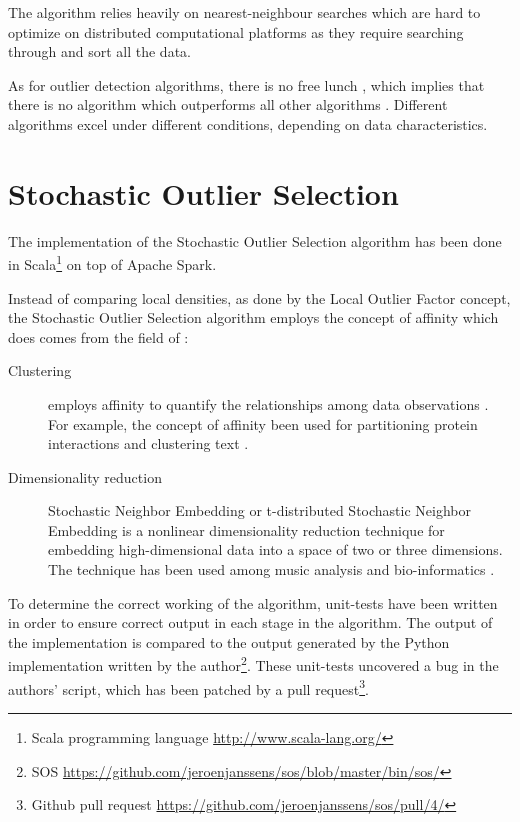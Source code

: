 The algorithm relies heavily on nearest-neighbour searches which are hard to optimize on distributed computational platforms as they require searching through and sort all the data.

As for outlier detection algorithms, there is no free lunch \cite{Wolpert95nofree}, which implies that there is no algorithm which outperforms all other algorithms \cite{outlierselection}. Different algorithms excel under different conditions, depending on data characteristics.

\section{Stochastic Outlier Selection \label{sec:sos}}

The implementation of the Stochastic Outlier Selection algorithm has been done in Scala\footnote{Scala programming language \url{http://www.scala-lang.org/}} on top of Apache Spark.

Instead of comparing local densities, as done by the Local Outlier Factor concept, the Stochastic Outlier Selection algorithm employs the concept of affinity which does comes from the field of \cite{ictdbid:2777,AISTATS09_Maaten}:

\begin{description}
  \item[Clustering] employs affinity to quantify the relationships among data observations \cite{Frey2007}. For example, the concept of affinity been used for partitioning protein interactions \cite{pmid19331680} and clustering text \cite{10.1109/TKDE.2010.144}.
  \item[Dimensionality reduction] Stochastic Neighbor Embedding \cite{NIPS20022276} or t-distributed Stochastic Neighbor Embedding \cite{van2008visualizing,ictdbid:2777} is a nonlinear dimensionality reduction technique for embedding high-dimensional data into a space of two or three dimensions. The technique has been used among music analysis \cite{Hamel+al:2010} and bio-informatics \cite{journals/bioinformatics/WallachL09}.
\end{description}

To determine the correct working of the algorithm, unit-tests have been written in order to ensure correct output in each stage in the algorithm. The output of the implementation is compared to the output generated by the Python implementation written by the author\footnote{SOS \url{https://github.com/jeroenjanssens/sos/blob/master/bin/sos/}}. These unit-tests uncovered a bug in the authors' script, which has been patched by a pull request\footnote{Github pull request \url{https://github.com/jeroenjanssens/sos/pull/4/}}.

